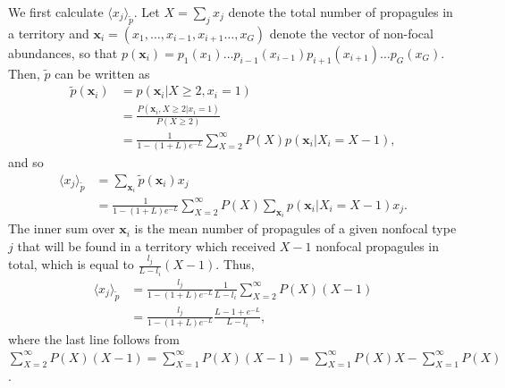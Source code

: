 \documentclass[12pt]{article}
\begin{document}
We first calculate $\langle x_j \rangle_{\tilde{p}}$. Let $X=\sum_j x_j$ denote the total number of propagules in a territory and ${\mathbf x_i}=(x_1,\ldots,x_{i-1},x_{i+1}\ldots,x_G)$ denote the vector of non-focal abundances, so that $p({\mathbf x_i})=p_1(x_1)\ldots p_{i-1}(x_{i-1})p_{i+1}(x_{i+1})\ldots p_G(x_G)$. Then, $\tilde{p}$ can be written as
\begin{align}
\tilde{p}({\mathbf x_i})&=p({\mathbf x_i}|X\geq 2,x_i=1)\nonumber\\
&=\frac{P({\mathbf x_i},X\geq 2|x_i=1)}{P(X\geq 2)}\nonumber\\
&=\frac{1}{1-(1+L)e^{-L}}\sum_{X=2}^{\infty} P(X) p({\mathbf x_i}|X_i=X-1),
\end{align}
and so
\begin{align}
\langle x_j \rangle_{\tilde{p}}&=\sum_{\mathbf x_i} \tilde{p}({\mathbf x_i})x_j\nonumber\\
&=\frac{1}{1-(1+L)e^{-L}}\sum_{X=2}^{\infty} P(X) \sum_{\mathbf x_i} p({\mathbf x_i}|X_i=X-1)x_j.
\label{eq:raremonster1}
\end{align}
The inner sum over ${\mathbf x_i}$ is the mean number of propagules of a given nonfocal type $j$ that will be found in a territory which received $X-1$ nonfocal propagules in total, which is equal to $\frac{l_j}{L-l_i}(X-1)$. Thus, 
\begin{align}
\langle x_j \rangle_{\tilde{p}}&=\frac{l_j}{1-(1+L)e^{-L}}\frac{1}{L-l_i}\sum_{X=2}^{\infty} P(X) (X-1)\nonumber\\
&=\frac{l_j}{1-(1+L)e^{-L}}\frac{L-1+e^{-L}}{L-l_i},
\label{eq:meanxjrare}
\end{align}
where the last line follows from $\sum_{X=2}^{\infty} P(X)(X-1)=\sum_{X=1}^{\infty} P(X)(X-1)=\sum_{X=1}^{\infty} P(X)X-\sum_{X=1}^{\infty}P(X)$.
\end{document}
